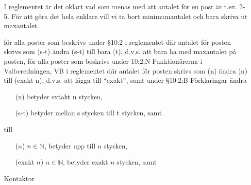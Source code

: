 \documentclass[../_main/handlingar.tex]{subfiles}
\begin{document}

I reglementet är det oklart vad som menas med att antalet för en post är t.ex. 2-5. För att göra det hela enklare vill vi ta bort minimumantalet och bara skriva ut maxantalet.

\begin{attsatser}
    \att för alla poster som beskrivs under \S10:2 i reglementet där antalet för posten skrivs som (s-t) ändra (s-t) till bara (t), d.v.s. att bara ha med maxantalet på posten,
    \att för alla poster som beskrivs under 10:2:N Funktionärerna i Valberedningen, VB i reglementet där antalet för posten skrivs som (n) ändra (n) till (exakt n), d.v.s. att lägga till ``exakt'', samt
    \att under \S10:2:B Förklaringar ändra\par
        \begin{itshape}
            \begin{itemize}
                \item[(n)] betyder extakt n stycken,
                \item[(s-t)] betyder mellan s stycken till t stycken, samt
            \end{itemize}
        \end{itshape}\par
        till\par
        \begin{itshape}
            \begin{itemize}
                \item[($n$)] $n \in \mathbb{N}$, betyder upp till $n$ stycken,
                \item[(exakt $n$)] $n \in \mathbb{N}$, betyder exakt $n$ stycken, samt
            \end{itemize}
        \end{itshape}
\end{attsatser}

\begin{signatures}{1}
    \ist
    \signature{\sekr}{Kontaktor}
\end{signatures}
\end{document}
